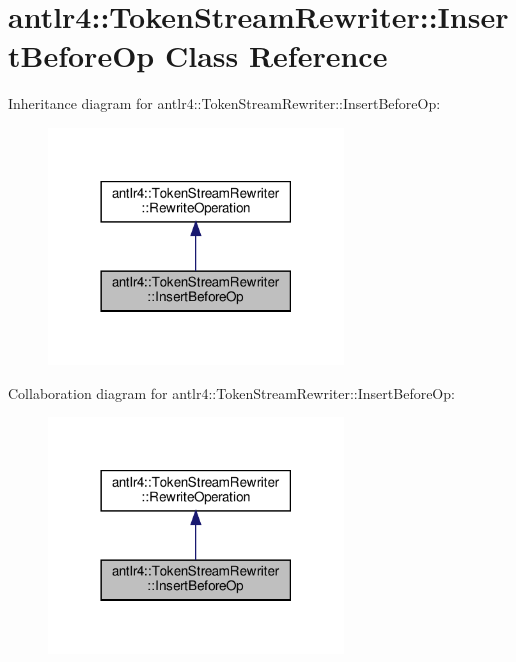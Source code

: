 \hypertarget{classantlr4_1_1TokenStreamRewriter_1_1InsertBeforeOp}{}\section{antlr4\+:\+:Token\+Stream\+Rewriter\+:\+:Insert\+Before\+Op Class Reference}
\label{classantlr4_1_1TokenStreamRewriter_1_1InsertBeforeOp}


Inheritance diagram for antlr4\+:\+:Token\+Stream\+Rewriter\+:\+:Insert\+Before\+Op\+:
\nopagebreak
\begin{figure}[H]
\begin{center}
\leavevmode
\includegraphics[width=222pt]{classantlr4_1_1TokenStreamRewriter_1_1InsertBeforeOp__inherit__graph}
\end{center}
\end{figure}


Collaboration diagram for antlr4\+:\+:Token\+Stream\+Rewriter\+:\+:Insert\+Before\+Op\+:
\nopagebreak
\begin{figure}[H]
\begin{center}
\leavevmode
\includegraphics[width=222pt]{classantlr4_1_1TokenStreamRewriter_1_1InsertBeforeOp__coll__graph}
\end{center}
\end{figure}
